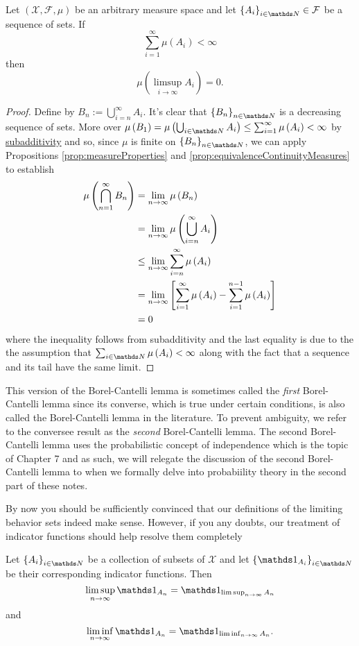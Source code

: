 \begin{thm}
\label{thm:borelCantelli}Let $\left(\mathcal{X},\mathcal{F},\mu\right)$
be an arbitrary measure space and let $\left\{ A_{i}\right\} _{i\in\N}\in\mathcal{F}$
be a sequence of sets. If
\[
\sum_{i=1}^{\infty}\mu\left(A_{i}\right)<\infty
\]
then
\[
\mu\left(\limsup_{i\to\infty}A_{i}\right)=0.
\]
\end{thm}

\begin{proof}
Define by $B_{n}:=\bigcup_{i=n}^{\infty}A_{i}$. It's clear that $\left\{ B_{n}\right\} _{n\in\N}$
is a decreasing sequence of sets. More over $\mu\left(B_{1}\right)=\mu\left(\bigcup_{i\in\N}A_{i}\right)\leq\sum_{i=1}^{\infty}\mu\left(A_{i}\right)<\infty$
by \hyperref[cor:countableSubadditivity]{subadditivity} and so, since
$\mu$ is finite on $\left\{ B_{n}\right\} _{n\in\N}$, we can apply
Propositions \ref{prop:measureProperties} and \ref{prop:equivalenceContinuityMeasures}
to establish
\begin{align*}
\mu\left(\bigcap_{n=1}^{\infty}B_{n}\right) & =\lim_{n\to\infty}\mu\left(B_{n}\right)\\
 & =\lim_{n\to\infty}\text{\ensuremath{\mu\left(\bigcup_{i=n}^{\infty}A_{i}\right)}}\\
 & \leq\lim_{n\to\infty}\sum_{i=n}^{\infty}\mu\left(A_{i}\right)\\
 & =\lim_{n\to\infty}\left[\sum_{i=1}^{\infty}\mu\left(A_{i}\right)-\sum_{i=1}^{n-1}\mu\left(A_{i}\right)\right]\\
 & =0
\end{align*}
where the inequality follows from subadditivity and the last equality
is due to the the assumption that $\sum_{i\in\N}\mu\left(A_{i}\right)<\infty$
along with the fact that a sequence and its tail have the same limit.
\end{proof}
\begin{rem*}
This version of the Borel-Cantelli lemma is sometimes called the \emph{first
}Borel-Cantelli lemma since its converse, which is true under certain
conditions, is also called the Borel-Cantelli lemma in the literature.
To prevent ambiguity, we refer to the conversee result as the \emph{second
}Borel-Cantelli lemma. The second Borel-Cantelli lemma uses the probabilistic
concept of independence which is the topic of Chapter 7 and as such,
we will relegate the discussion of the second Borel-Cantelli lemma
to when we formally delve into probabiility theory in the second part
of these notes.
\end{rem*}
By now you should be sufficiently convinced that our definitions of
the limiting behavior sets indeed make sense. However, if you any
doubts, our treatment of indicator functions should help resolve them
completely
\begin{prop}
\label{prop:limSupInfIndicator}Let $\left\{ A_{i}\right\} _{i\in\N}$
be a collection of subsets of $\mathcal{X}$ and let $\left\{ \indicate_{A_{i}}\right\} _{i\in\N}$
be their corresponding indicator functions. Then
\[
\limsup_{n\to\infty}\indicate_{A_{n}}=\indicate_{\limsup_{n\to\infty}A_{n}}
\]
and
\[
\liminf_{n\to\infty}\indicate_{A_{n}}=\indicate_{\liminf_{n\to\infty}A_{n}}.
\]
\end{prop}

